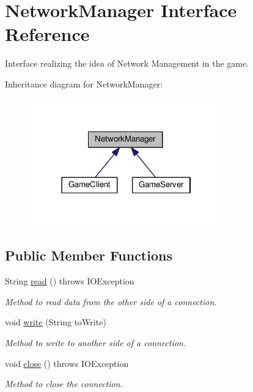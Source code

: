 \hypertarget{interfaceNetworkManager}{}\section{Network\+Manager Interface Reference}
\label{interfaceNetworkManager}


Interface realizing the idea of Network Management in the game.  




Inheritance diagram for Network\+Manager\+:
\nopagebreak
\begin{figure}[H]
\begin{center}
\leavevmode
\includegraphics[width=238pt]{interfaceNetworkManager__inherit__graph}
\end{center}
\end{figure}
\subsection*{Public Member Functions}
\begin{DoxyCompactItemize}
\item 
String \hyperlink{interfaceNetworkManager_a1770d9c0eba406494ffb1f7e9a86e05f}{read} ()  throws I\+O\+Exception
\begin{DoxyCompactList}\small\item\em Method to read data from the other side of a connection. \end{DoxyCompactList}\item 
void \hyperlink{interfaceNetworkManager_a3c292bfd3d98fa5d04a14c493b8f14b0}{write} (String to\+Write)
\begin{DoxyCompactList}\small\item\em Method to write to another side of a connection. \end{DoxyCompactList}\item 
void \hyperlink{interfaceNetworkManager_a33643bfa896c4b9d0050ef0aa79ac16d}{close} ()  throws I\+O\+Exception\hypertarget{interfaceNetworkManager_a33643bfa896c4b9d0050ef0aa79ac16d}{}\label{interfaceNetworkManager_a33643bfa896c4b9d0050ef0aa79ac16d}

\begin{DoxyCompactList}\small\item\em Method to close the connection. \end{DoxyCompactList}\end{DoxyCompactItemize}


